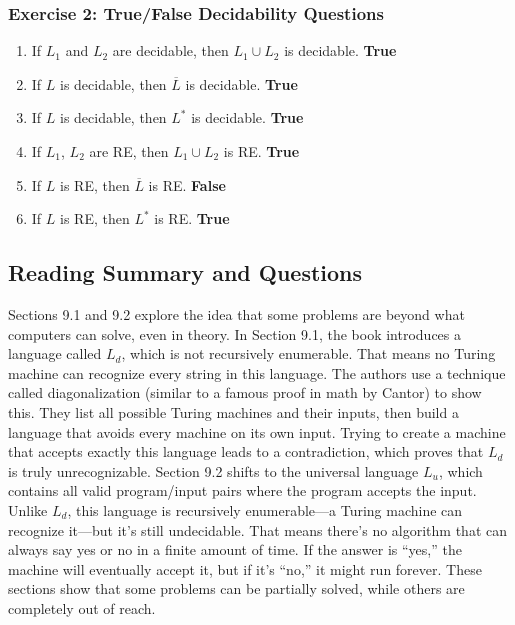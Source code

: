 \documentclass{article}
\theoremstyle{theorem}
\theoremstyle{definition}
\theoremstyle{remark}
\begin{document}
\vspace{1em}

\subsubsection*{Exercise 2: True/False Decidability Questions}

\begin{enumerate}
    \item If $L_1$ and $L_2$ are decidable, then $L_1 \cup L_2$ is decidable. \textbf{True}
    \item If $L$ is decidable, then $\overline{L}$ is decidable. \textbf{True}
    \item If $L$ is decidable, then $L^*$ is decidable. \textbf{True}
    \item If $L_1$, $L_2$ are RE, then $L_1 \cup L_2$ is RE. \textbf{True}
    \item If $L$ is RE, then $\overline{L}$ is RE. \textbf{False}
    \item If $L$ is RE, then $L^*$ is RE. \textbf{True}
\end{enumerate}

\subsection*{Reading Summary and Questions}
Sections 9.1 and 9.2 explore the idea that some problems are beyond what computers can solve, even in theory. In Section 9.1, the book introduces 
a language called $L_d$, which is not recursively enumerable. That means no Turing machine can recognize every string in this language. The authors 
use a technique called diagonalization (similar to a famous proof in math by Cantor) to show this. They list all possible Turing machines and their 
inputs, then build a language that avoids every machine on its own input. Trying to create a machine that accepts exactly this language leads to a 
contradiction, which proves that $L_d$ is truly unrecognizable. Section 9.2 shifts to the universal language $L_u$, which contains all valid program/input 
pairs where the program accepts the input. Unlike $L_d$, this language is recursively enumerable—a Turing machine can recognize it—but it’s still undecidable. 
That means there’s no algorithm that can always say yes or no in a finite amount of time. If the answer is “yes,” the machine will eventually accept it, but 
if it’s “no,” it might run forever. These sections show that some problems can be partially solved, while others are completely out of reach.
\end{document}
